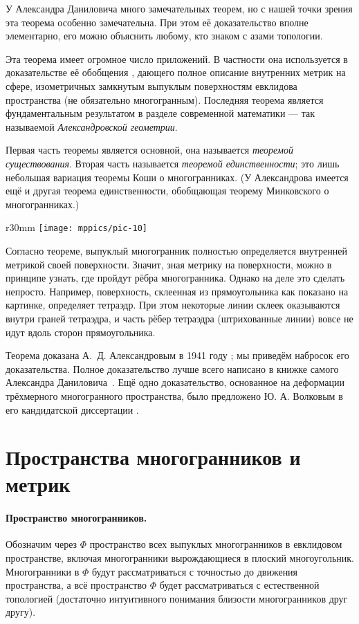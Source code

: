 \documentclass[oneside,a4paper]{article}
\begin{document}
У Александра Даниловича много замечательных теорем, но с нашей точки зрения эта теорема особенно замечательна.
При этом её доказательство вполне элементарно, его можно объяснить любому, кто знаком с азами топологии.

Эта теорема имеет огромное число приложений.
В частности она используется в доказательстве её обобщения \cite{alexandrov-1948},
дающего полное описание внутренних метрик на сфере, изометричных замкнутым выпуклым поверхностям  евклидова пространства (не обязательно многогранным).
Последняя теорема является фундаментальным результатом в разделе современной математики --- так называемой \emph{Александровской геометрии}.

Первая часть теоремы является основной, она называется \emph{теоремой существования}.
Вторая часть называется \emph{теоремой единственности}; это лишь небольшая вариация теоремы Коши о многогранниках.
(У Александрова имеется ещё и другая теорема единственности, обобщающая теорему Минковского о многогранниках.)

\begin{wrapfigure}{r}{30mm}
\vskip-4mm
\centering
\texttt{[image: mppics/pic-10]}
\vskip-0mm
\end{wrapfigure}

Согласно теореме, выпуклый многогранник полностью определяется внутренней метрикой своей поверхности.
Значит, зная метрику на поверхности, можно в принципе узнать, где пройдут рёбра многогранника.
Однако на деле это сделать непросто.
Например, поверхность, склеенная из прямоугольника как показано на картинке, определяет тетраэдр.
При этом некоторые линии склеек оказываются внутри граней тетраэдра, и часть рёбер тетраэдра (штрихованные линии) вовсе не идут вдоль сторон прямоугольника.

Теорема доказана А.~Д. Александровым в 1941 году \cite{alexandrov-1941};
мы приведём набросок его доказательства. 
Полное доказательство лучше всего написано в книжке самого Александра Даниловича~\cite{alexandrov}.
Ещё одно доказательство, основанное на деформации трёхмерного многогранного пространства, было предложено Ю. А. Волковым в его кандидатской диссертации \cite{volkov}.


\section{Пространства многогранников и метрик}

\paragraph{Пространство многогранников.}
Обозначим через $\Phi$ пространство всех выпуклых многогранников в евклидовом пространстве, включая многогранники вырождающиеся в плоский многоугольник.
Многогранники в $\Phi$ будут рассматриваться с точностью до движения пространства, а всё пространство $\Phi$ будет рассматриваться с естественной топологией (достаточно интуитивного понимания близости многогранников друг другу).
\end{document}
